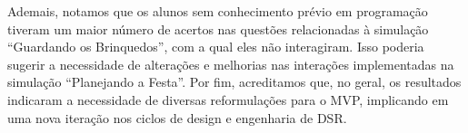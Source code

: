 Ademais, notamos que os alunos sem conhecimento prévio em programação tiveram um maior número de acertos nas questões relacionadas à simulação \enquote{Guardando os Brinquedos}, com a qual eles não interagiram. Isso poderia sugerir a necessidade de alterações e melhorias nas interações implementadas na simulação \enquote{Planejando a Festa}. Por fim, acreditamos que, no geral, os resultados indicaram a necessidade de diversas reformulações para o MVP, implicando em uma nova iteração nos ciclos de design e engenharia de DSR.


